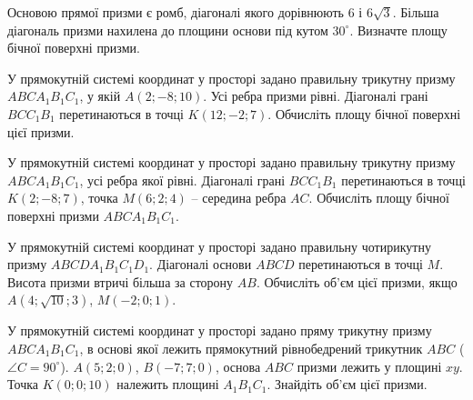 \documentclass[12pt]{article}
\begin{document}
\begin{samepage}
\noindent\zadnum Основою прямої призми є ромб, діагоналі якого дорівнюють 6 і $6\sqrt{3}$. Більша діагональ призми нахилена до площини основи під кутом $30^\circ$. Визначте площу бічної поверхні призми. 

\nmtnobreak
\nopagebreak\nbvspace{0.5cm}
\nmtAnswerBox
\par{}
\end{samepage}

\begin{samepage}
\noindent\zadnum У прямокутній системі координат у просторі задано правильну трикутну призму $ABCA_1B_1C_1$, у якій $A(2; -8; 10)$. Усі ребра призми рівні. Діагоналі грані $BCC_1B_1$ перетинаються в точці $K(12; -2; 7)$. Обчисліть площу бічної поверхні цієї призми. 

\nmtnobreak
\nopagebreak\nbvspace{0.5cm}
\nmtAnswerBox
\par{}
\end{samepage}

\begin{samepage}
\noindent\zadnum У прямокутній системі координат у просторі задано правильну трикутну призму $ABCA_1B_1C_1$, усі ребра якої рівні. Діагоналі грані $BCC_1B_1$ перетинаються в точці $K(2; -8; 7)$, точка $M(6; 2; 4)$ – середина ребра $AC$. Обчисліть площу бічної поверхні призми $ABCA_1B_1C_1$. 

\nmtnobreak
\nopagebreak\nbvspace{0.5cm}
\nmtAnswerBox
\par{}
\end{samepage}

\begin{samepage}
\noindent\zadnum У прямокутній системі координат у просторі задано правильну чотирикутну призму $ABCDA_1B_1C_1D_1$. Діагоналі основи $ABCD$ перетинаються в точці $M$. Висота призми втричі більша за сторону $AB$. Обчисліть об’єм цієї призми, якщо $A(4; \sqrt{10}; 3)$, $M(-2; 0; 1)$. 

\nmtnobreak
\nopagebreak\nbvspace{0.5cm}
\nmtAnswerBox
\par{}
\end{samepage}

\begin{samepage}
\noindent\zadnum У прямокутній системі координат у просторі задано пряму трикутну призму $ABCA_1B_1C_1$, в основі якої лежить прямокутний рівнобедрений трикутник $ABC$ ($\angle C = 90^\circ$). $A(5; 2; 0)$, $B(-7; 7; 0)$, основа $ABC$ призми лежить у площині $xy$. Точка $K(0; 0; 10)$ належить площині $A_1B_1C_1$. Знайдіть об’єм цієї призми. 

\nmtnobreak
\nopagebreak\nbvspace{0.5cm}
\nmtAnswerBox
\par{}
\end{samepage}
\end{document}
